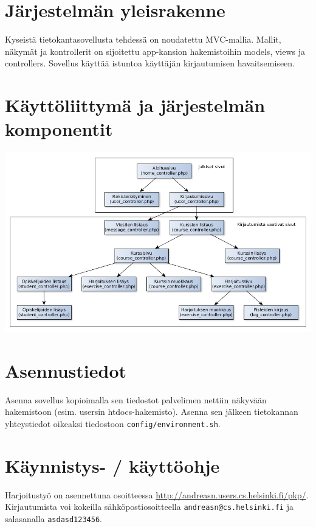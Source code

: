 \documentclass[a4paper,12pt, titlepage]{article}
\begin{document}
\section{Järjestelmän yleisrakenne}

Kyseistä tietokantasovellusta tehdessä on noudatettu MVC-mallia.
Mallit, näkymät ja kontrollerit on sijoitettu app-kansion hakemistoihin models, views ja controllers.
Sovellus käyttää istuntoa käyttäjän kirjautumisen havaitsemiseen.

\section{Käyttöliittymä ja järjestelmän komponentit}

\includegraphics[scale=0.45]{kayttoliittyma}

\section{Asennustiedot}

Asenna sovellus kopioimalla sen tiedostot palvelimen nettiin näkyvään hakemistoon (esim. usersin htdocs-hakemisto).
Asenna sen jälkeen tietokannan yhteystiedot oikeaksi tiedostoon \verb|config/environment.sh|.

\section{Käynnistys- / käyttöohje}

Harjoitustyö on asennettuna osoitteessa \url{http://andreasn.users.cs.helsinki.fi/pkp/}.
Kirjautumista voi kokeilla sähköpostiosoitteella \verb|andreasn@cs.helsinki.fi|
ja salasanalla \verb|asdasd123456|.
\end{document}
